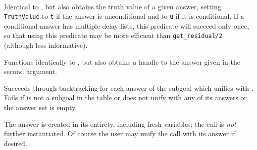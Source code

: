 \begin{description}
\begin{minipage}{6in}
\end{minipage} \\


%
Identical to , but also obtains the truth value
of a given answer, setting {\tt TruthValue} to {\tt t} if the answer
is unconditional and to {\tt u} if it is conditional.  If a
conditional answer has multiple delay lists, this predicate will
succeed only once, so that using this predicate may be more efficient
than {\tt get\_residual/2} (although less informative).


%
Functions identically to , but also obtains a
handle to the answer given in the second argument.


%
Succeeds through backtracking for each answer of the subgoal
 which unifies with .  Fails if
 is not a subgoal in the table or 
does not unify with any of its answers or the answer set is empty.

The answer is created in its entirety, including fresh variables; the
call is \emph{not} further instantiated.  Of course the user may unify
the call with its answer if desired.



\end{description}
